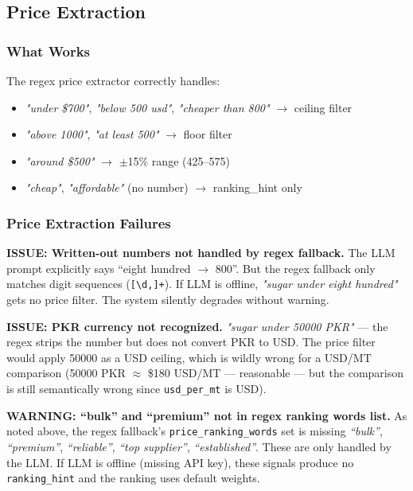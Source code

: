 \documentclass[12pt,a4paper]{article}
\begin{document}
\subsection{Price Extraction}

\subsubsection{What Works}

The regex price extractor correctly handles:
\begin{itemize}
  \item \textit{"under \$700"}, \textit{"below 500 usd"}, \textit{"cheaper than 800"} $\rightarrow$ ceiling filter
  \item \textit{"above 1000"}, \textit{"at least 500"} $\rightarrow$ floor filter
  \item \textit{"around \$500"} $\rightarrow$ $\pm$15\% range (425--575)
  \item \textit{"cheap"}, \textit{"affordable"} (no number) $\rightarrow$ ranking\_hint only
\end{itemize}

\subsubsection{Price Extraction Failures}

\begin{issueBox}
\textbf{ISSUE: Written-out numbers not handled by regex fallback.}
The LLM prompt explicitly says ``eight hundred $\rightarrow$ 800''. But the regex
fallback only matches digit sequences (\texttt{[\textbackslash d,]+}). If LLM is offline,
\textit{"sugar under eight hundred"} gets no price filter. The system silently degrades
without warning.
\end{issueBox}

\begin{issueBox}
\textbf{ISSUE: PKR currency not recognized.}
\textit{"sugar under 50000 PKR"} --- the regex strips the number but does not convert
PKR to USD. The price filter would apply 50000 as a USD ceiling, which is wildly wrong
for a USD/MT comparison (50000 PKR $\approx$ \$180 USD/MT --- reasonable --- but the
comparison is still semantically wrong since \texttt{usd\_per\_mt} is USD).
\end{issueBox}

\begin{warnBox}
\textbf{WARNING: ``bulk'' and ``premium'' not in regex ranking words list.}
As noted above, the regex fallback's \texttt{price\_ranking\_words} set is missing
\textit{``bulk''}, \textit{``premium''}, \textit{``reliable''}, \textit{``top supplier''}, \textit{``established''}.
These are only handled by the LLM. If LLM is offline (missing API key), these signals
produce no \texttt{ranking\_hint} and the ranking uses default weights.
\end{warnBox}
\end{document}
